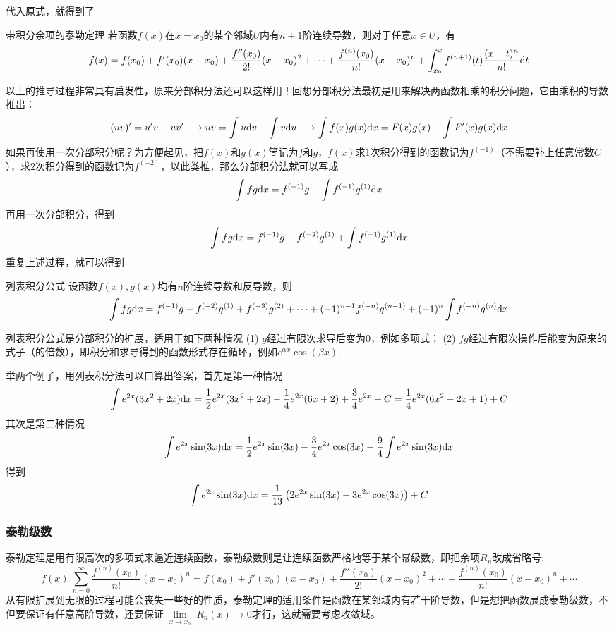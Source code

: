 \documentclass[main.tex]{subfiles}
\begin{document}
代入原式，就得到了
\begin{theorem}{带积分余项的泰勒定理}
    若函数\(f(x)\)在\(x=x_0\)的某个邻域\(U\)内有\(n+1\)阶连续导数，则对于任意\(x\in U\)，有
    \[f(x)=f(x_0)+f'(x_0)(x-x_0)+\frac{f''(x_0)}{2!}(x-x_0)^2+\cdots+\frac{f^{(n)}(x_0)}{n!}(x-x_0)^n+\int_{x_0}^{x}f^{(n+1)}(t)\frac{(x-t)^{n}}{n!}{\rm d}t\]
\end{theorem}

以上的推导过程非常具有启发性，原来分部积分法还可以这样用！回想分部积分法最初是用来解决两函数相乘的积分问题，它由乘积的导数推出：
\[(uv)'=u'v+uv' \longrightarrow uv = \int u{\rm d}v+\int v{\rm d}u  \longrightarrow \int f(x)g(x){\rm d}x = F(x)g(x)-\int F'(x)g(x){\rm d}x\]
如果再使用一次分部积分呢？为方便起见，把\(f(x)\)和\(g(x)\)简记为\(f\)和\(g\)，\(f(x)\)求\(1\)次积分得到的函数记为\(f^{(-1)}\)（不需要补上任意常数\(C\)），求\(2\)次积分得到的函数记为\(f^{(-2)}\)，以此类推，那么分部积分法就可以写成
\[\int fg{\rm d}x=f^{(-1)}g-\int f^{(-1)}g^{(1)} {\rm d}x\]
再用一次分部积分，得到
\[\int fg{\rm d}x=f^{(-1)}g-f^{(-2)}g^{(1)}+\int f^{(-1)}g^{(1)} {\rm d}x\]
重复上述过程，就可以得到
\begin{theorem}{列表积分公式}
    设函数\(f(x),g(x)\)均有\(n\)阶连续导数和反导数，则
    \[\int fg{\rm d}x=f^{(-1)}g-f^{(-2)}g^{(1)}+f^{(-3)}g^{(2)}+\cdots+(-1)^{n-1}f^{(-n)}g^{(n-1)}+(-1)^n\int f^{(-n)}g^{(n)} {\rm d}x\]
\end{theorem}

列表积分公式是分部积分的扩展，适用于如下两种情况
\newline
(1) \(g\)经过有限次求导后变为\(0\)，例如多项式；\newline
(2) \(fg\)经过有限次操作后能变为原来的式子（的倍数），即积分和求导得到的函数形式存在循环，例如\(e^{\alpha x}\cos(\beta x)\).

举两个例子，用列表积分法可以口算出答案，首先是第一种情况
\[\int e^{2x}(3x^2+2x){\rm d}x = \frac{1}{2}e^{2x}(3x^2+2x)-\frac{1}{4}e^{2x}(6x+2)+\frac{3}{4}e^{2x}+C=\frac{1}{4}e^{2x}(6x^2-2x+1)+C\]
其次是第二种情况
\[\int e^{2x}\sin(3x){\rm d}x = \frac{1}{2}e^{2x}\sin(3x)-\frac{3}{4}e^{2x}\cos(3x)-\frac{9}{4}\int e^{2x}\sin(3x){\rm d}x\]
得到
\[\int e^{2x}\sin(3x){\rm d}x = \frac{1}{13}\left(2e^{2x}\sin(3x)-3e^{2x}\cos(3x)\right)+C\]

\subsubsection{泰勒级数}

泰勒定理是用有限高次的多项式来逼近连续函数，泰勒级数则是让连续函数严格地等于某个幂级数，即把余项\(R_n\)改成省略号:
\[f(x) ~ \sum_{n=0}^{\infty} \frac{f^{(n)}(x_0)}{n!}(x-x_0)^n = f(x_0)+f'(x_0)(x-x_0)+\frac{f''(x_0)}{2!}(x-x_0)^2+\cdots+\frac{f^{(n)}(x_0)}{n!}(x-x_0)^n+\cdots\]
从有限扩展到无限的过程可能会丧失一些好的性质，泰勒定理的适用条件是函数在某邻域内有若干阶导数，但是想把函数展成泰勒级数，不但要保证有任意高阶导数，还要保证\(\lim \limits_{\substack{x \to x_0}}R_n(x) \to 0\)才行，这就需要考虑收敛域。
\end{document}
